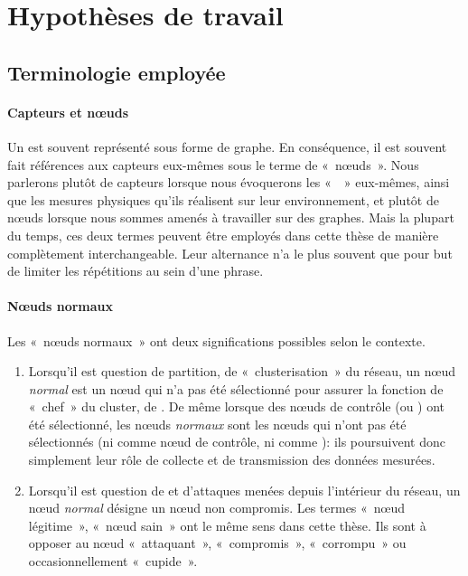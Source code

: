 \section{Hypothèses de travail}


    \subsection{Terminologie employée}

        \paragraph{Capteurs et nœuds}
Un \rcsf est souvent représenté sous forme de graphe.
En conséquence, il est souvent fait références aux capteurs eux-mêmes sous le terme de « nœuds ».
Nous parlerons plutôt de capteurs lorsque nous évoquerons les « \rcs » eux-mêmes, ainsi que les mesures physiques qu'ils réalisent sur leur environnement, et plutôt de nœuds lorsque nous sommes amenés à travailler sur des graphes.
Mais la plupart du temps, ces deux termes peuvent être employés dans cette thèse de manière complètement interchangeable.
Leur alternance n'a le plus souvent que pour but de limiter les répétitions au sein d'une phrase.

        \paragraph{Nœuds normaux}
Les « nœuds normaux » ont deux significations possibles selon le contexte.
\begin{enumerate}
    \item Lorsqu'il est question de partition, de « clusterisation » du réseau, un nœud \textit{normal} est un nœud qui n'a pas été sélectionné pour assurer la fonction de « chef » du cluster, de \ch. De même lorsque des nœuds de contrôle (\cns ou \vns) ont été sélectionné, les nœuds \textit{normaux} sont les nœuds qui n'ont pas été sélectionnés (ni comme nœud de contrôle, ni comme \ch): ils poursuivent donc simplement leur rôle de collecte et de transmission des données mesurées.
    \item Lorsqu'il est question de \secu et d'attaques menées depuis l'intérieur du réseau, un nœud \textit{normal} désigne un nœud non compromis. Les termes « nœud légitime », « nœud sain » ont le même sens dans cette thèse. Ils sont à opposer au nœud « attaquant », « compromis », « corrompu » ou occasionnellement « cupide ».
\end{enumerate}

